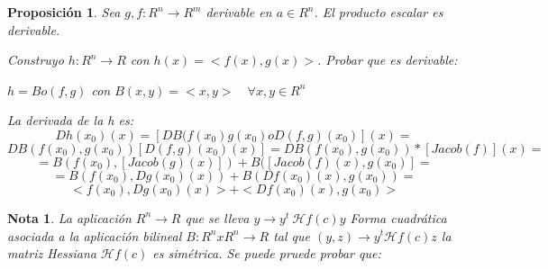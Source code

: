\documentclass[11pt, a4paper, titlepage]{article}
\makeatletter
\renewenvironment{proof}[1][\proofname] {\vspace{-15pt}\par\pushQED{\qed}\normalfont\topsep6\p@\@plus6\p@\relax\trivlist\item[\hskip\labelsep\it#1\@addpunct{.}]\ignorespaces}{\popQED\endtrivlist\@endpefalse}
\theoremstyle{theorem-style}
\newtheorem*{nprop}{Proposición}
\theoremstyle{definition-style}
\theoremstyle{remark-style}
\newtheorem*{nota}{Nota}
\theoremstyle{example-style}
\makeatother
\begin{document}
\begin{nprop}
	Sea $g,f: R^n \to R^m$ derivable en $a \in R^n$. El producto escalar es derivable.
	
\begin{proof}
		Construyo $h: R^n \to R$ con $h(x) = < f(x), g(x)>$. Probar que es derivable:
	
	$h = B o (f,g)$ con $B(x,y) = <x,y> \quad \forall x,y \in R^n$
	
	La derivada de la h es:
	\[
	Dh(x_0)(x) = [DB(f(x_0)g(x_0) o D(f,g)(x_0)](x) =\]\[DB(f(x_0),g(x_0))[D(f,g)(x_0)(x)] = DB(f(x_0),g(x_0))*[Jacob(f)](x) = 
	\]
	\[
	= B(f(x_0),[Jacob(g)(x)]) + B([Jacob(f)(x), g(x_0)] = \]
	\[
	 = B(f(x_0),Dg(x_0)(x)) + B(Df(x_0)(x),g(x_0)) = 
	\]
	\[
	<f(x_0),Dg(x_0)(x) > + < Df(x_0)(x),g(x_0)>
	\]
\end{proof}
	
\end{nprop}

\begin{nota}
	La aplicación $R^n \to R$ que se lleva $y \to y^t \ \mathcal{H}f(c)y$  Forma cuadrática asociada a la aplicación bilineal $B:R^nxR^n \to R$ tal que $(y,z) \to y^t\mathcal{H}f(c)z$ la matriz Hessiana $\mathcal{H}f(c)$ es simétrica. Se puede pruede probar que:


\end{nota}
\end{document}

